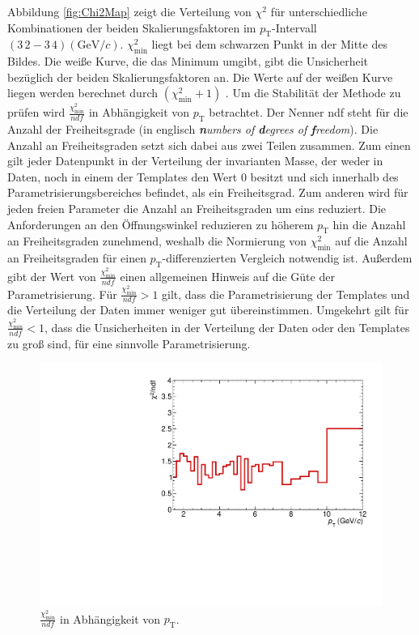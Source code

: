 \newline
Abbildung \ref{fig:Chi2Map} zeigt die Verteilung von $\chi^{2}$ für unterschiedliche Kombinationen der beiden Skalierungsfaktoren im $p_{\text{T}}$-Intervall $(3\,2 - 3\,4)(\text{GeV}/c)$.
$\chi^{2}_\text{min}$ liegt bei dem schwarzen Punkt in der Mitte des Bildes.
Die weiße Kurve, die das Minimum umgibt, gibt die Unsicherheit bezüglich der beiden Skalierungsfaktoren an.
Die Werte auf der weißen Kurve liegen werden berechnet durch $\left(\chi^{2}_\text{min}+1\right)$ \cite{book:chi2}.
\newline
Um die Stabilität der Methode zu prüfen wird $\frac{\chi^{2}_\text{min}}{ndf}$ in Abhängigkeit von $p_{\text{T}}$ betrachtet.
Der Nenner ndf steht für die Anzahl der Freiheitsgrade (in englisch \textit{\textbf{n}umbers of \textbf{d}egrees of \textbf{f}reedom}).
Die Anzahl an Freiheitsgraden setzt sich dabei aus zwei Teilen zusammen.
Zum einen gilt jeder Datenpunkt in der Verteilung der invarianten Masse, der weder in Daten, noch in einem der Templates den Wert 0 besitzt und sich innerhalb des Parametrisierungsbereiches befindet, als ein Freiheitsgrad.
Zum anderen wird für jeden freien Parameter die Anzahl an Freiheitsgraden um eins reduziert.
Die Anforderungen an den Öffnungswinkel reduzieren zu höherem $p_{\text{T}}$ hin die Anzahl an Freiheitsgraden zunehmend, weshalb die Normierung von $\chi^{2}_\text{min}$ auf die Anzahl an Freiheitsgraden für einen $p_{\text{T}}$-differenzierten Vergleich notwendig ist.
Außerdem gibt der Wert von $\frac{\chi^{2}_\text{min}}{ndf}$ einen allgemeinen Hinweis auf die Güte der Parametrisierung.
Für $\frac{\chi^{2}_\text{min}}{ndf} > 1$ gilt, dass die Parametrisierung der Templates und die Verteilung der Daten immer weniger gut übereinstimmen.
Umgekehrt gilt für $\frac{\chi^{2}_\text{min}}{ndf} < 1$, dass die Unsicherheiten in der Verteilung der Daten oder den Templates zu groß sind, für eine sinnvolle Parametrisierung.
\begin{figure}[tp]
\centering
\includegraphics[width=.65\linewidth]{Chi2NoComp_Data_2016.pdf}
\caption{$\frac{\chi^{2}_\text{min}}{ndf}$ in Abhängigkeit von $p_{\text{T}}$.
}
\label{fig:Chi2pT}
\end{figure}
